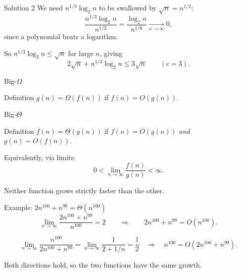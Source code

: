 \documentclass[10pt,aspectratio=169]{beamer}
\begin{document}
\begin{frame}{Solution 2}
  We need $n^{1/3}\log_2 n$ to be swallowed by $\sqrt{n} = n^{1/2}$:
  \[
    \frac{n^{1/3}\log_2 n}{n^{1/2}} = \frac{\log_2 n}{n^{1/6}} \xrightarrow[n \to \infty]{} 0,
  \]
  since a polynomial beats a logarithm.

  \bigskip
  So $n^{1/3}\log_2 n \le \sqrt{n}$ for large $n$, giving
  \[
    2\sqrt{n} + n^{1/3}\log_2 n \le 3\sqrt{n}
    \qquad (c = 3).
  \]
\end{frame}

\begin{frame}{Big-$\Omega$}
  \begin{block}{Definition}
    $g(n) = \Omega(f(n))$ if $f(n) = O(g(n))$.
  \end{block}

  \bigskip
  \begin{center}
  \end{center}
\end{frame}

\begin{frame}{Big-$\Theta$}
  \begin{block}{Definition}
    $f(n) = \Theta(g(n))$ if $f(n) = O(g(n))$ \emph{and} $g(n) = O(f(n))$.
  \end{block}

  \bigskip
  Equivalently, via limits:
  \[
    0 < \lim_{n \to \infty}\frac{f(n)}{g(n)} < \infty.
  \]

  \bigskip
  \begin{center}
    Neither function grows strictly faster than the other.
  \end{center}
\end{frame}

\begin{frame}{Example: $2n^{100} + n^{99} = \Theta(n^{100})$}
  \[
    \lim_{n \to \infty} \frac{2n^{100} + n^{99}}{n^{100}} = 2
    \qquad\Longrightarrow\qquad
    2n^{100} + n^{99} = O(n^{100}).
  \]

  \bigskip
  \[
    \lim_{n \to \infty} \frac{n^{100}}{2n^{100} + n^{99}}
    = \lim_{n \to \infty}\frac{1}{2 + 1/n} = \frac{1}{2}
    \quad\Longrightarrow\quad
    n^{100} = O(2n^{100} + n^{99}).
  \]

  \bigskip
  Both directions hold, so the two functions have the \alert{same growth}.
\end{frame}
\end{document}
